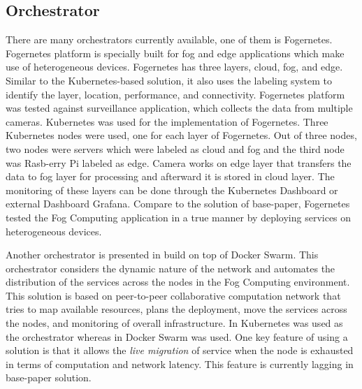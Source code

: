   \subsection{Orchestrator}
  \label{sec:infra}
  There are many orchestrators currently available, one of them is Fogernetes\cite{Wobker2018}. Fogernetes\cite{Wobker2018} platform is specially built for fog and edge applications which make use of heterogeneous devices. Fogernetes\cite{Wobker2018} has three layers, cloud, fog, and edge. Similar to the Kubernetes-based solution\cite{Santos2019}, it also uses the labeling system to identify the layer, location, performance, and connectivity\cite{Wobker2018}. Fogernetes\cite{Wobker2018} platform was tested against surveillance application, which collects the data from multiple cameras. Kubernetes was used for the implementation of Fogernetes\cite{Wobker2018}. Three Kubernetes nodes were used, one for each layer of Fogernetes\cite{Wobker2018}. Out of three nodes, two nodes were servers which were labeled as cloud and fog and the third node was Rasb-erry Pi labeled as edge\cite{Wobker2018}. Camera works on edge layer that transfers the data to fog layer for processing and afterward it is stored in cloud layer. The monitoring of these layers can be done through the  Kubernetes Dashboard or external Dashboard Grafana. Compare to the solution of base-paper\cite{Santos2019}, Fogernetes\cite{Wobker2018} tested the Fog Computing application in a true manner by deploying services on heterogeneous devices.\par
  Another orchestrator is presented in \cite{Reale} build on top of Docker Swarm. This orchestrator considers the dynamic nature of the network and automates the distribution of the services across the nodes in the Fog Computing environment\cite{Reale}. This solution is based on peer-to-peer collaborative computation network that tries to map available resources, plans the deployment, move the services across the nodes, and monitoring of overall infrastructure\cite{Reale}. In \cite{Santos2019} Kubernetes was used as the orchestrator whereas in \cite{Reale} Docker Swarm was used. One key feature of using a solution\cite{Reale} is that it allows the \emph{live migration} of service when the node is exhausted in terms of computation and network latency. This feature is currently lagging in base-paper solution\cite{Santos2019}.
